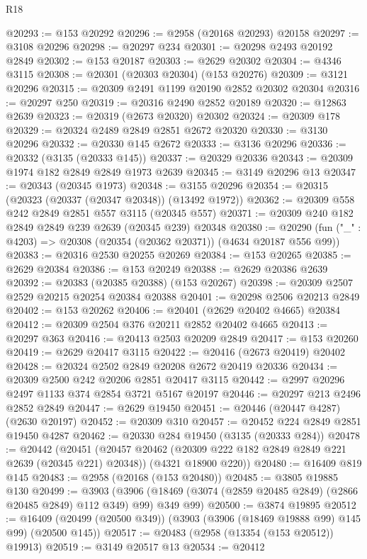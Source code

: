 \begin{lexlean}{R18}
\begin{coremodule}
@20293 := @153 @20292
@20296 := @2958 (@20168 @20293) @20158
@20297 := @3108 @20296
@20298 := @20297 @234
@20301 := @20298 @2493 @20192 @2849
@20302 := @153 @20187
@20303 := @2629 @20302
@20304 := @4346 @3115
@20308 := @20301 (@20303 @20304) (@153 @20276)
@20309 := @3121 @20296
@20315 := @20309 @2491 @1199 @20190 @2852 @20302 @20304
@20316 := @20297 @250
@20319 := @20316 @2490 @2852 @20189
@20320 := @12863 @2639
@20323 := @20319 (@2673 @20320) @20302
@20324 := @20309 @178
@20329 := @20324 @2489 @2849 @2851 @2672 @20320
@20330 := @3130 @20296
@20332 := @20330 @145 @2672
@20333 := @3136 @20296
@20336 := @20332 (@3135 (@20333 @145))
@20337 := @20329 @20336
@20343 := @20309 @1974 @182 @2849 @2849 @1973 @2639
@20345 := @3149 @20296 @13
@20347 := @20343 (@20345 @1973)
@20348 := @3155 @20296
@20354 := @20315 (@20323 (@20337 (@20347 @20348)) (@13492 @1972))
@20362 := @20309 @558 @242 @2849 @2851 @557 @3115 (@20345 @557)
@20371 := @20309 @240 @182 @2849 @2849 @239 @2639 (@20345 @239) @20348
@20380 := @20290 (fun ("_" : @4203) => @20308 (@20354 (@20362 @20371)) (@4634 @20187 @556 @99))
@20383 := @20316 @2530 @20255 @20269
@20384 := @153 @20265
@20385 := @2629 @20384
@20386 := @153 @20249
@20388 := @2629 @20386 @2639
@20392 := @20383 (@20385 @20388) (@153 @20267)
@20398 := @20309 @2507 @2529 @20215 @20254 @20384 @20388
@20401 := @20298 @2506 @20213 @2849
@20402 := @153 @20262
@20406 := @20401 (@2629 @20402 @4665) @20384
@20412 := @20309 @2504 @376 @20211 @2852 @20402 @4665
@20413 := @20297 @363
@20416 := @20413 @2503 @20209 @2849
@20417 := @153 @20260
@20419 := @2629 @20417 @3115
@20422 := @20416 (@2673 @20419) @20402
@20428 := @20324 @2502 @2849 @20208 @2672 @20419 @20336
@20434 := @20309 @2500 @242 @20206 @2851 @20417 @3115
@20442 := @2997 @20296 @2497 @1133 @374 @2854 @3721 @5167 @20197
@20446 := @20297 @213 @2496 @2852 @2849
@20447 := @2629 @19450
@20451 := @20446 (@20447 @4287) (@2630 @20197)
@20452 := @20309 @310
@20457 := @20452 @224 @2849 @2851 @19450 @4287
@20462 := @20330 @284 @19450 (@3135 (@20333 @284))
@20478 := @20442
    (@20451
      (@20457 @20462 (@20309 @222 @182 @2849 @2849 @221 @2639 (@20345 @221) @20348))
      (@4321 @18900 @220))
@20480 := @16409 @819 @145
@20483 := @2958 (@20168 (@153 @20480))
@20485 := @3805 @19885 @130
@20499 := @3903
    (@3906 (@18469 (@3074 (@2859 @20485 @2849) (@2866 @20485 @2849) @112 @349) @99) @349 @99)
@20500 := @3874 @19895
@20512 := @16409 (@20499 (@20500 @349)) (@3903 (@3906 (@18469 @19888 @99) @145 @99) (@20500 @145))
@20517 := @20483 (@2958 (@13354 (@153 @20512)) @19913)
@20519 := @3149 @20517 @13
@20534 := @20412

\end{coremodule}
\end{lexlean}

